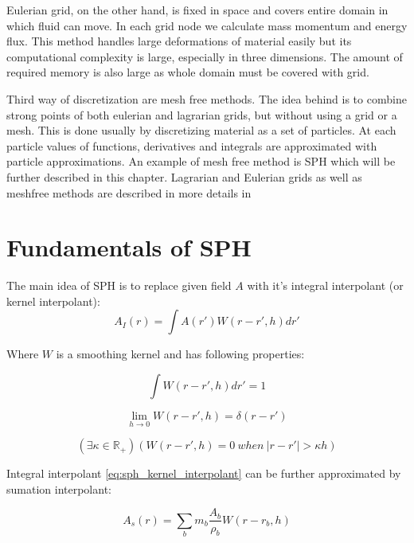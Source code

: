 Eulerian grid, on the other hand, is fixed in space and covers entire domain in which fluid can move. In each grid node we calculate mass momentum and energy flux. This method handles large deformations of material easily but its computational complexity is large, especially in three dimensions. The amount of required memory is also large as whole domain must be covered with grid. 

Third way of discretization are mesh free methods. The idea behind is to combine strong points of both eulerian and lagrarian grids, but without using a grid or a mesh. This is done usually by discretizing material as a set of particles. At each particle values of functions, derivatives and integrals are approximated with particle approximations. An example of mesh free method is SPH which will be further described in this chapter. 
Lagrarian and Eulerian grids as well as meshfree methods are described in more details in \cite[chapter 1]{Liu}

\section{Fundamentals of SPH}

The main idea of SPH is to replace given field $A$ with it's integral interpolant (or kernel interpolant):
\begin{equation}
\label{eq:sph_kernel_interpolant}
A_I(r) = \int A(r')W(r - r', h)dr'
\end{equation}

Where $W$ is a smoothing kernel and has following properties:

\begin{equation}
\label{eq:sph_kernel_property_1}
\int W(r - r', h)dr' = 1
\end{equation}

\begin{equation}
\label{eq:sph_kernel_property_2}
\lim_{h \to 0}W(r - r', h) = \delta(r-r')
\end{equation}

\begin{equation}
\label{eq:compact_condition}
(\exists \kappa \in \mathbb{R}_+ )(W(r-r', h) = 0~when~|r-r'| > \kappa h)
\end{equation}

Integral interpolant \ref{eq:sph_kernel_interpolant} can be further approximated by sumation interpolant:

\begin{equation}
\label{eq:sumation_interpolant}
A_s(r) = \sum_{b}m_b\frac{A_b}{\rho_b}W(r-r_b,h)
\end{equation}

